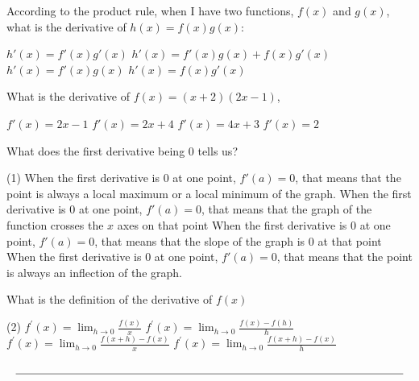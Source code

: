 \documentclass[12pt, noquestionbreak, flushbottom, customfontpath=../Fonts/]{../skrexam}  %
\begin{document}
\begin{questions}
	
	\question According to the product rule, when I have two functions, $f(x)$ and $g(x)$, what is the derivative of $h(x) = f(x) g(x)$:
	\begin{choices}
		\choice $h'(x) = f'(x) g '(x)$
		\choice\CorrectChoice $h'(x) = f'(x) g(x)+ f(x) g '(x)$
		\choice $h'(x) = f'(x) g(x)$
		\choice $h'(x) = f(x) g '(x)$
	\end{choices}

	\question What is the derivative of  $f(x) = (x + 2)(2x- 1)$,
	\begin{choices}
		\choice $f'(x) = 2x - 1$
		\choice $f'(x) = 2x + 4$
		\choice\CorrectChoice $f'(x) = 4 x + 3$
		\choice $f'(x) = 2$
	\end{choices}




	\question What does the first derivative being 0 tells us?
	\begin{choices}(1)
		\choice When the first derivative is $0$ at one point, $f'(a) = 0$, that means that the point is always a local maximum or a local minimum of the graph.
		\choice When the first derivative is $0$ at one point, $f'(a) = 0$, that means that the graph of the function crosses the $x$ axes on that point
		\choice\CorrectChoice When the first derivative is $0$ at one point, $f'(a) = 0$, that means that the slope of the graph is $0$ at that point
		\choice When the first derivative is $0$ at one point, $f'(a) = 0$, that means that the point is always an inflection of the graph.
	\end{choices}

\question What is the definition of the derivative of $f(x)$
 	\begin{choices}(2)
	\choice $\displaystyle f^\prime(x) = \lim_{h \to 0} \frac{f(x)}{x}$
	\choice $\displaystyle f^\prime(x) = \lim_{h \to 0} \frac{f(x) - f(h)}{h}$
	\choice $\displaystyle f^\prime(x) = \lim_{h \to 0} \frac{f(x+h)-f(x)}{x}$	
 	\choice\CorrectChoice $\displaystyle f^\prime(x) = \lim_{h \to 0} \frac{f(x+h)-f(x)}{h}$
 	\end{choices}

\end{questions}






\[
\underset{%
	}{%
	\text{\underline{\hspace{\textwidth}}}%
}
\]
\setcounter{totalpages}{\value{page}}
\setcounter{totalsections}{\value{section}}
\end{document}
